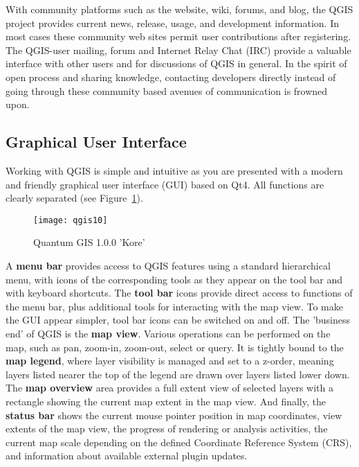 With community platforms such as the website, wiki, forums, and blog, the QGIS
project provides current news, release, usage, and development information. In
most cases these community web sites permit user contributions after
registering.  The QGIS-user mailing, forum and Internet Relay Chat (IRC)
provide a valuable interface with other users and for discussions of QGIS in
general. In the spirit of open process and sharing knowledge, contacting
developers directly instead of going through these community based avenues of
communication is frowned upon.

\subsection{Graphical User Interface}

Working with QGIS is simple and intuitive as you are presented with a
modern and friendly graphical user interface (GUI) based on Qt4. All
functions are clearly separated (see Figure~\ref{fig:qgis10}).

\begin{figure}[h]
   \begin{center}
   \caption{Quantum GIS 1.0.0 'Kore'}\label{fig:qgis10}\smallskip
   \texttt{[image: qgis10]}
\end{center}
\end{figure}

A \textbf{menu bar} provides access to QGIS features using a standard
hierarchical menu, with icons of the corresponding tools as they appear on
the tool bar and with keyboard shortcuts. The \textbf{tool bar} icons provide
direct access to functions of the menu bar, plus additional tools for
interacting with the map view. To make the GUI appear simpler, tool bar icons
can be switched on and off. The 'business end' of QGIS is the \textbf{map
view}. Various operations can be performed on the map, such as pan, zoom-in,
zoom-out, select or query. It is tightly bound to the \textbf{map legend},
where layer visibility is managed and set to a z-order, meaning layers
listed nearer the top of the legend are drawn over layers listed lower down.
The \textbf{map overview} area provides a full extent view of selected layers
with a rectangle showing the current map extent in the map view. And finally,
the
\textbf{status bar} shows the current mouse pointer position in map
coordinates, view extents of the map view, the progress of rendering or
analysis activities, the current map scale depending on the defined
Coordinate Reference System (CRS), and information about available external
plugin updates.

